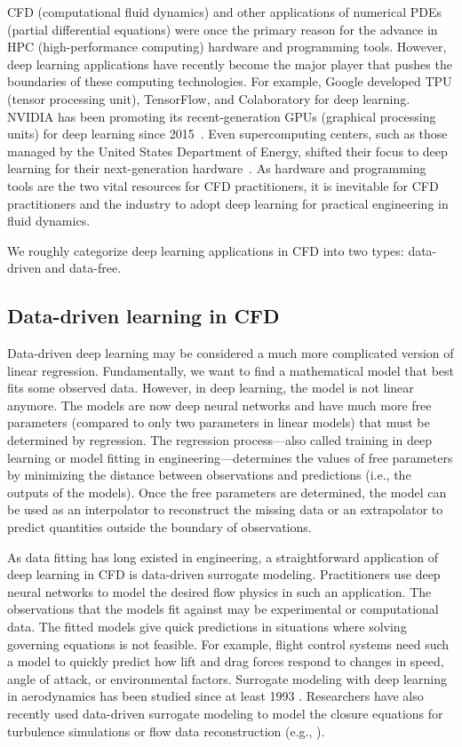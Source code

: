 
CFD (computational fluid dynamics) and other applications of numerical PDEs (partial differential equations) were once the primary reason for the advance in HPC (high-performance computing) hardware and programming tools.
However, deep learning applications have recently become the major player that pushes the boundaries of these computing technologies.
For example, Google developed TPU (tensor processing unit), TensorFlow, and Colaboratory for deep learning.
NVIDIA has been promoting its recent-generation GPUs (graphical processing units) for deep learning since 2015~\cite{buck_nvidias_2015}.
Even supercomputing centers, such as those managed by the United States Department of Energy, shifted their focus to deep learning for their next-generation hardware~\cite{us_department_of_energy_argonne_2019}.
As hardware and programming tools are the two vital resources for CFD practitioners, it is inevitable for CFD practitioners and the industry to adopt deep learning for practical engineering in fluid dynamics.

We roughly categorize deep learning applications in CFD into two types: data-driven and data-free.

\subsection*{Data-driven learning in CFD}

Data-driven deep learning may be considered a much more complicated version of linear regression.
Fundamentally, we want to find a mathematical model that best fits some observed data.
However, in deep learning, the model is not linear anymore.
The models are now deep neural networks and have much more free parameters (compared to only two parameters in linear models) that must be determined by regression.
The regression process---also called training in deep learning or model fitting in engineering---determines the values of free parameters by minimizing the distance between observations and predictions (i.e., the outputs of the models).
Once the free parameters are determined, the model can be used as an interpolator to reconstruct the missing data or an extrapolator to predict quantities outside the boundary of observations.

As data fitting has long existed in engineering, a straightforward application of deep learning in CFD is data-driven surrogate modeling.
Practitioners use deep neural networks to model the desired flow physics in such an application.
The observations that the models fit against may be experimental or computational data.
The fitted models give quick predictions in situations where solving governing equations is not feasible.
For example, flight control systems need such a model to quickly predict how lift and drag forces respond to changes in speed, angle of attack, or environmental factors. 
Surrogate modeling with deep learning in aerodynamics has been studied since at least 1993 \cite{linse_identification_1993, faller_unsteady_1997}.
Researchers have also recently used data-driven surrogate modeling to model the closure equations for turbulence simulations or flow data reconstruction (e.g., \cite{Tracey2015,milano_neural_2002}).

